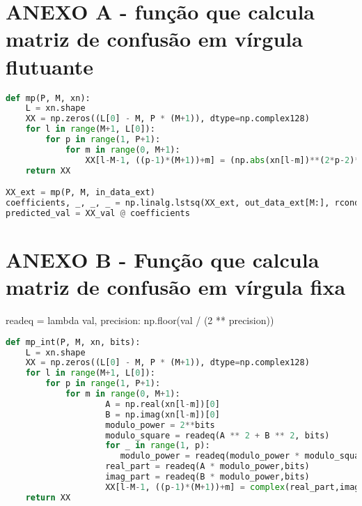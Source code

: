 \section{\normalsize ANEXO A - função que calcula matriz de confusão em vírgula flutuante}
\label{cod:mp}
\small %
\begin{lstlisting}[language = Python, ]
def mp(P, M, xn):
    L = xn.shape
    XX = np.zeros((L[0] - M, P * (M+1)), dtype=np.complex128)
    for l in range(M+1, L[0]):
        for p in range(1, P+1):
            for m in range(0, M+1):
                XX[l-M-1, ((p-1)*(M+1))+m] = (np.abs(xn[l-m])**(2*p-2)*(xn[l-m]))[0]
    return XX

XX_ext = mp(P, M, in_data_ext)
coefficients, _, _, _ = np.linalg.lstsq(XX_ext, out_data_ext[M:], rcond=None)
predicted_val = XX_val @ coefficients

\end{lstlisting}

\section*{\normalsize ANEXO B - Função que calcula matriz de confusão em vírgula fixa}

readeq = lambda val, precision: np.floor(val / (2 ** precision))

\label{cod:mpint}
\small %
\begin{lstlisting}[language = Python, ]
    def mp_int(P, M, xn, bits):
    L = xn.shape
    XX = np.zeros((L[0] - M, P * (M+1)), dtype=np.complex128)
    for l in range(M+1, L[0]):
        for p in range(1, P+1):
            for m in range(0, M+1):
                    A = np.real(xn[l-m])[0]
                    B = np.imag(xn[l-m])[0]
                    modulo_power = 2**bits 
                    modulo_square = readeq(A ** 2 + B ** 2, bits)
                    for _ in range(1, p):
                       modulo_power = readeq(modulo_power * modulo_square, bits)
                    real_part = readeq(A * modulo_power,bits)
                    imag_part = readeq(B * modulo_power,bits)
                    XX[l-M-1, ((p-1)*(M+1))+m] = complex(real_part,imag_part)        
    return XX

\end{lstlisting}
